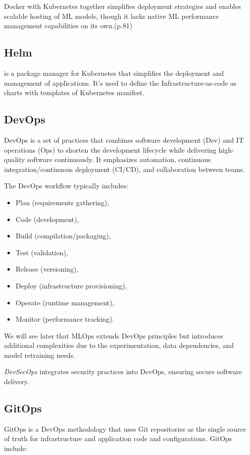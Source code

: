 Docker with Kubernetes together simplifies deployment strategies and enables scalable hosting of ML models,
though it lacks native ML performance management capabilities on its own.\cite{treveil2020introducing}(p.81)

\subsection{Helm}\label{subsec:helm}
is a package manager for Kubernetes that simplifies the deployment and management of applications\cite{9792270}.
It's used to define the Infrastructure-as-code as charts with templates of Kubernetes manifest.

\subsection{DevOps}\label{subsec:devops}
DevOps is a set of practices that combines software development (Dev) and IT
operations (Ops) to shorten the development lifecycle while delivering
high-quality software continuously\cite{devops}.
It emphasizes automation, continuous integration/continuous deployment (CI/CD), and collaboration between
teams.

The DevOps workflow typically includes:

\begin{itemize}
    \item Plan (requirements gathering),
    \item Code (development),
    \item Build (compilation/packaging),
    \item Test (validation),
    \item Release (versioning),
    \item Deploy (infrastructure provisioning),
    \item Operate (runtime management),
    \item Monitor (performance tracking).
\end{itemize}
We will see later that MLOps extends DevOps principles but introduces additional complexities due to the experimentation,
data dependencies, and model retraining needs\cite{10.1145/3533378}.

\textit{DevSecOps} integrates security practices into DevOps, ensuring secure software delivery.

\subsection{GitOps}\label{subsec:gitops}
GitOps\cite{gitops} is a DevOps methodology that uses Git repositories as the single source of truth for infrastructure and application code and configurations\cite{inproceedings}.
GitOps include:

